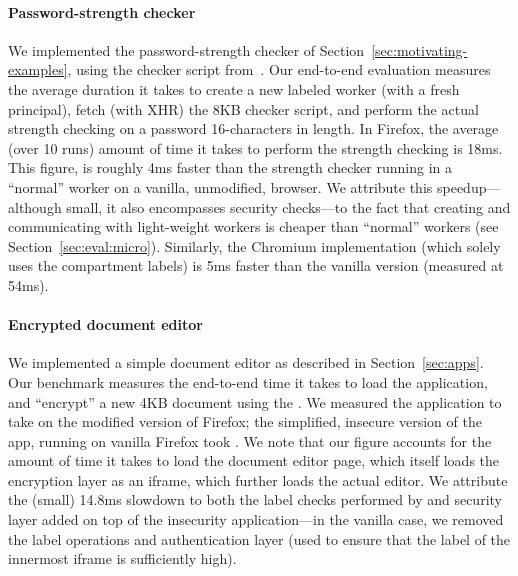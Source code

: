 \paragraph{Password-strength checker}
%
We implemented the password-strength checker of
Section~\ref{sec:motivating-examples}, using the checker script
from~\cite{checker1}.
%
Our end-to-end evaluation measures the average duration it takes to
create a new labeled worker (with a fresh principal), fetch (with XHR)
the 8KB checker script, and perform the actual strength
checking on a password 16-characters in length.
%
%
In Firefox, the average (over 10 runs) amount of time it takes to
perform the strength checking is 18ms.
%
This figure, is roughly 4ms faster than the strength checker 
running in a ``normal'' worker on a vanilla, unmodified, browser.
%
We attribute this speedup---although small, it also encompasses
security checks---to the fact that creating and communicating with
light-weight workers is cheaper than ``normal'' workers (see
Section~\ref{sec:eval:micro}).
%
Similarly, the Chromium implementation (which solely uses the
compartment labels) is 5ms faster than the vanilla version (measured
at 54ms).


\paragraph{Encrypted document editor}

We implemented a simple document editor as described in
Section~\ref{sec:apps}.
%
Our benchmark measures the end-to-end time it takes to load the
application, and ``encrypt'' a new 4KB document using
the .
%
We measured the \sys{} application to take  on the modified
version of Firefox; the simplified, insecure version of the app,
running on vanilla Firefox took .
%
We note that our figure accounts for the amount of time it takes to
load the document editor page, which itself loads the encryption layer
as an iframe, which further loads the actual editor.
%
We attribute the (small) 14.8ms slowdown to both the label checks
performed by \sys{} and security layer added on top of the insecurity
application---in the vanilla case, we removed the label operations and
authentication layer (used to ensure that the label of the innermost
iframe is sufficiently high).
%


